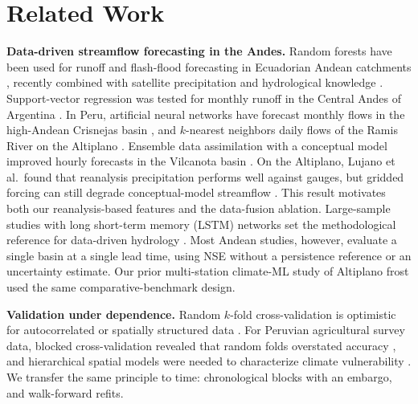 \documentclass[graybox]{svmult}
\begin{document}
\section{Related Work}
\label{sec:related}

\textbf{Data-driven streamflow forecasting in the Andes.} Random forests have been used for runoff and flash-flood forecasting in Ecuadorian Andean catchments \cite{munoz2018rf}, recently combined with satellite precipitation and hydrological knowledge \cite{munoz2025rf}. Support-vector regression was tested for monthly runoff in the Central Andes of Argentina \cite{teverovsky2023svr}. In Peru, artificial neural networks have forecast monthly flows in the high-Andean Crisnejas basin \cite{ramos2023crisnejas}, and $k$-nearest neighbors daily flows of the Ramis River on the Altiplano \cite{quispe2023ramis}. Ensemble data assimilation with a conceptual model improved hourly forecasts in the Vilcanota basin \cite{llauca2023vilcanota}. On the Altiplano, Lujano et al.\ found that reanalysis precipitation performs well against gauges, but gridded forcing can still degrade conceptual-model streamflow \cite{lujano2025gridded}. This result motivates both our reanalysis-based features and the data-fusion ablation. Large-sample studies with long short-term memory (LSTM) networks set the methodological reference for data-driven hydrology \cite{kratzert2018lstm,kratzert2019lstm,gauch2021lstm,addor2017camels,nearing2021role}. Most Andean studies, however, evaluate a single basin at a single lead time, using NSE without a persistence reference or an uncertainty estimate. Our prior multi-station climate-ML study of Altiplano frost \cite{torres2025frost} used the same comparative-benchmark design.

\textbf{Validation under dependence.} Random $k$-fold cross-validation is optimistic for autocorrelated or spatially structured data \cite{bergmeir2012cv,roberts2017cv}. For Peruvian agricultural survey data, blocked cross-validation revealed that random folds overstated accuracy \cite{torres2026blockedcv}, and hierarchical spatial models were needed to characterize climate vulnerability \cite{torres2026bayescar}. We transfer the same principle to time: chronological blocks with an embargo, and walk-forward refits.
\end{document}
